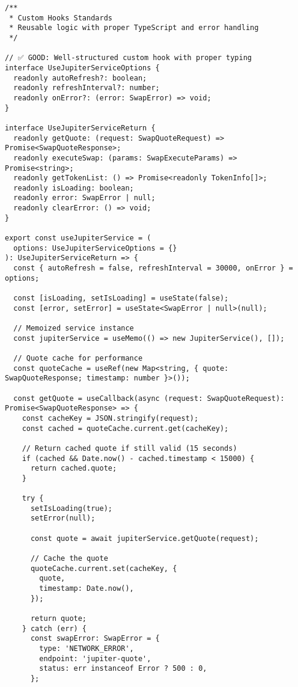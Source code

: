 \documentclass[11pt,a4paper]{article}
\begin{document}
\begin{lstlisting}[style=typescript, caption=Custom Hooks Best Practices]
/**
 * Custom Hooks Standards
 * Reusable logic with proper TypeScript and error handling
 */

// ✅ GOOD: Well-structured custom hook with proper typing
interface UseJupiterServiceOptions {
  readonly autoRefresh?: boolean;
  readonly refreshInterval?: number;
  readonly onError?: (error: SwapError) => void;
}

interface UseJupiterServiceReturn {
  readonly getQuote: (request: SwapQuoteRequest) => Promise<SwapQuoteResponse>;
  readonly executeSwap: (params: SwapExecuteParams) => Promise<string>;
  readonly getTokenList: () => Promise<readonly TokenInfo[]>;
  readonly isLoading: boolean;
  readonly error: SwapError | null;
  readonly clearError: () => void;
}

export const useJupiterService = (
  options: UseJupiterServiceOptions = {}
): UseJupiterServiceReturn => {
  const { autoRefresh = false, refreshInterval = 30000, onError } = options;
  
  const [isLoading, setIsLoading] = useState(false);
  const [error, setError] = useState<SwapError | null>(null);
  
  // Memoized service instance
  const jupiterService = useMemo(() => new JupiterService(), []);
  
  // Quote cache for performance
  const quoteCache = useRef(new Map<string, { quote: SwapQuoteResponse; timestamp: number }>());
  
  const getQuote = useCallback(async (request: SwapQuoteRequest): Promise<SwapQuoteResponse> => {
    const cacheKey = JSON.stringify(request);
    const cached = quoteCache.current.get(cacheKey);
    
    // Return cached quote if still valid (15 seconds)
    if (cached && Date.now() - cached.timestamp < 15000) {
      return cached.quote;
    }
    
    try {
      setIsLoading(true);
      setError(null);
      
      const quote = await jupiterService.getQuote(request);
      
      // Cache the quote
      quoteCache.current.set(cacheKey, {
        quote,
        timestamp: Date.now(),
      });
      
      return quote;
    } catch (err) {
      const swapError: SwapError = {
        type: 'NETWORK_ERROR',
        endpoint: 'jupiter-quote',
        status: err instanceof Error ? 500 : 0,
      };
      

\end{lstlisting}
\end{document}
